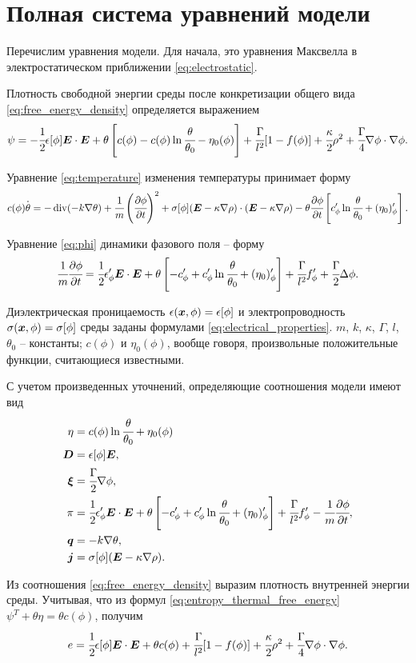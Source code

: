 
\section{Полная система уравнений модели}

Перечислим уравнения модели. Для начала, это уравнения Максвелла в электростатическом приближении \eqref{eq:electrostatic}.

Плотность свободной энергии среды после конкретизации общего вида \eqref{eq:free_energy_density} определяется выражением
\[
    \psi = -\cfrac{1}{2} \epsilon[\phi] {\boldsymbol{E}} \cdot {\boldsymbol{E}} + \theta \left[ c(\phi) - c(\phi) \ln \cfrac{\theta}{\theta_0} - \eta_0(\phi) \right] + \cfrac{\Gamma}{l^2}[1 - f(\phi)] + \cfrac{\kappa}{2} \rho^2 + \cfrac{\Gamma}{4} \nabla \phi \cdot \nabla \phi.
\]

Уравнение \eqref{eq:temperature} изменения температуры принимает форму
\[
    c(\phi) \overset{\boldsymbol{.}}{\theta} = - \operatorname{{div}}(-k \nabla \theta) + \cfrac{1}{m} \left( \cfrac{\partial \phi}{\partial t} \right)^2 + \sigma[\phi] ({\boldsymbol{E}} - \kappa \nabla \rho) \cdot ({\boldsymbol{E}} - \kappa \nabla \rho) - \theta \cfrac{\partial \phi}{\partial t} \left[ c'_\phi \ln \cfrac{\theta}{\theta_0} + (\eta_0)'_\phi \right].
\]

Уравнение \eqref{eq:phi} динамики фазового поля -- форму
\[
    \cfrac{1}{m} \cfrac{\partial \phi}{\partial t} = \cfrac{1}{2} \epsilon'_\phi {\boldsymbol{E}} \cdot {\boldsymbol{E}} + \theta \left[ -c'_\phi + c'_\phi \ln \cfrac{\theta}{\theta_0} + (\eta_0)'_\phi \right] + \cfrac{\Gamma}{l^2} f'_\phi + \cfrac{\Gamma}{2} \Delta \phi.
\]

Диэлектрическая проницаемость $\epsilon({\boldsymbol{x}}, \phi) = \epsilon[\phi]$ и электропроводность $\sigma({\boldsymbol{x}}, \phi) = \sigma[\phi]$ среды заданы формулами \eqref{eq:electrical_properties}. $m$, $k$, $\kappa$, $\Gamma$, $l$, $\theta_0$ -- константы; $c(\phi)$ и $\eta_0(\phi)$, вообще говоря, произвольные положительные функции, считающиеся известными.

С учетом произведенных уточнений, определяющие соотношения модели имеют вид
{\allowdisplaybreaks
\begin{align*}
    \eta &= c(\phi) \ln \cfrac{\theta}{\theta_0} + \eta_0(\phi) \\
    {\boldsymbol{D}} &= \epsilon[\phi] {\boldsymbol{E}}, \\
    {\boldsymbol{\xi}} &= \cfrac{\Gamma}{2} \nabla \phi, \\
    \pi &= \cfrac{1}{2} \epsilon'_\phi {\boldsymbol{E}} \cdot {\boldsymbol{E}} + \theta \left[ -c'_\phi + c'_\phi \ln \cfrac{\theta}{\theta_0} + (\eta_0)'_\phi \right] + \cfrac{\Gamma}{l^2} f'_\phi - \cfrac{1}{m} \cfrac{\partial \phi}{\partial t}, \\
    {\boldsymbol{q}} &= -k \nabla \theta, \\
    {\boldsymbol{j}} &= \sigma[\phi] ({\boldsymbol{E}} - \kappa \nabla \rho).
\end{align*}
}

Из соотношения \eqref{eq:free_energy_density} выразим плотность внутренней энергии среды. Учитывая, что из формул \eqref{eq:entropy_thermal_free_energy} $\psi^T + \theta \eta = \theta c(\phi)$, получим
\[
    e = \cfrac{1}{2} \epsilon[\phi] {\boldsymbol{E}} \cdot {\boldsymbol{E}} + \theta c(\phi) + \cfrac{\Gamma}{l^2}[1 - f(\phi)] + \cfrac{\kappa}{2} \rho^2 + \cfrac{\Gamma}{4} \nabla \phi \cdot \nabla \phi.
\]